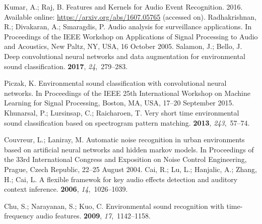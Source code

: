 \documentclass[sensors,article,accept,moreauthors,pdftex,10pt,a4paper]{mdpi}
\begin{document}
\begin{thebibliography}{999}
Kumar, A.; Raj, B.
\newblock Features and Kernels for Audio Event Recognition. 2016.
\newblock Available online: \mbox{\url{https://arxiv.org/abs/1607.05765}} ({accessed on}).
Radhakrishnan, R.; Divakaran, A.; Smaragdis, P.
\newblock Audio analysis for surveillance applications.
\newblock  In Proceedings of the IEEE Workshop on Applications of Signal Processing to Audio and
  Acoustics, {New Paltz, NY, USA, 16 October} 2005.
Salamon, J.; Bello, J.
\newblock Deep convolutional neural networks and data augmentation for
  environmental sound classification.
 {\bf 2017}, {\em 24},~279--283.

Piczak, K.
\newblock Environmental sound classification with convolutional neural
  networks.
\newblock  In Proceedings of the IEEE 25th International Workshop on Machine Learning for Signal
  Processing, {Boston, MA, USA, 17--20 September }2015.
Khunarsal, P.; Lursinsap, C.; Raicharoen, T.
\newblock Very short time environmental sound classification based on
  spectrogram pattern matching.
 {\bf 2013}, {\em 243},~57--74.

Couvreur, L.; Laniray, M.
\newblock Automatic noise recognition in urban environments based on artificial
  neural networks and hidden markov models.
\newblock  In Proceedings of the  33rd International Congress and Exposition on Noise Control
  Engineering, {Prague, Czech Republic,  22--25 August }2004.
Cai, R.; Lu, L.; Hanjalic, A.; Zhang, H.; Cai, L.
\newblock A flexible framewok for key audio effects detection and auditory
  context inference.
  {\bf 2006}, {\em 14},~1026--1039.

Chu, S.; Narayanan, S.; Kuo, C.
\newblock Environmental sound recognition with time-frequency audio features.
  {\bf 2009}, {\em 17},~1142--1158.


\end{thebibliography}
\end{document}
